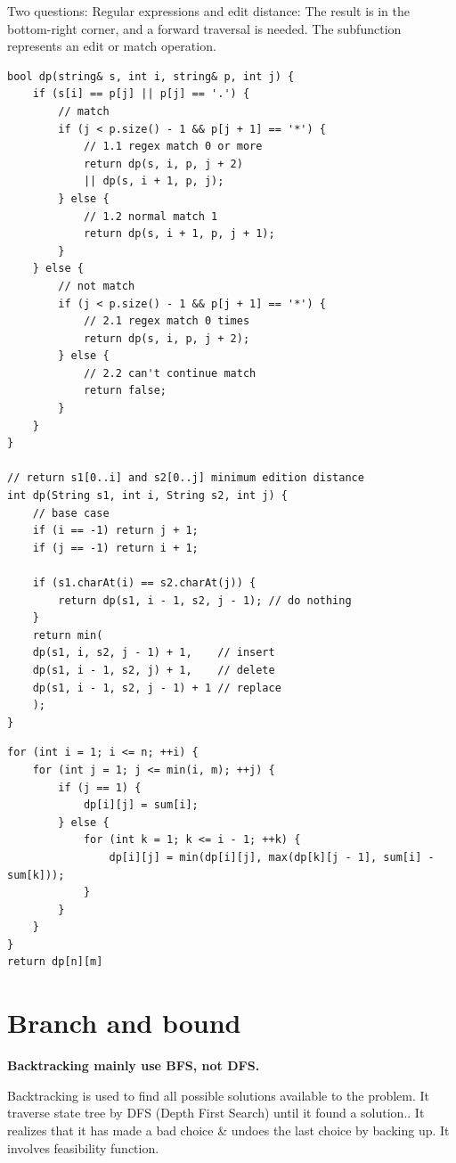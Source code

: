 \documentclass[a4paper,11pt,twoside]{book}
\begin{document}
	\par Two questions: Regular expressions and edit distance: The result is in the bottom-right corner, and a forward traversal is needed. The subfunction represents an edit or match operation.
\begin{lstlisting}
bool dp(string& s, int i, string& p, int j) {
	if (s[i] == p[j] || p[j] == '.') {
		// match
		if (j < p.size() - 1 && p[j + 1] == '*') {
			// 1.1 regex match 0 or more
			return dp(s, i, p, j + 2)
			|| dp(s, i + 1, p, j);
		} else {
			// 1.2 normal match 1 
			return dp(s, i + 1, p, j + 1);
		}
	} else {
		// not match 
		if (j < p.size() - 1 && p[j + 1] == '*') {
			// 2.1 regex match 0 times
			return dp(s, i, p, j + 2);
		} else {
			// 2.2 can't continue match
			return false;
		}
	}
}

// return s1[0..i] and s2[0..j] minimum edition distance
int dp(String s1, int i, String s2, int j) {
	// base case
	if (i == -1) return j + 1;
	if (j == -1) return i + 1;
	
	if (s1.charAt(i) == s2.charAt(j)) {
		return dp(s1, i - 1, s2, j - 1); // do nothing
	}
	return min(
	dp(s1, i, s2, j - 1) + 1,    // insert
	dp(s1, i - 1, s2, j) + 1,    // delete
	dp(s1, i - 1, s2, j - 1) + 1 // replace
	);
}		
\end{lstlisting}	
	

\begin{lstlisting}	
for (int i = 1; i <= n; ++i) {
	for (int j = 1; j <= min(i, m); ++j) {
		if (j == 1) {
			dp[i][j] = sum[i];
		} else {
			for (int k = 1; k <= i - 1; ++k) {
				dp[i][j] = min(dp[i][j], max(dp[k][j - 1], sum[i] - sum[k]));
			}
		}
	}
}
return dp[n][m]	
\end{lstlisting}	
	

	


\section{Branch and bound}

	\par \textbf{Backtracking mainly use BFS, not DFS.} 
	
	\par Backtracking is used to find all possible solutions available to the problem. It traverse state tree by DFS (Depth First Search) until it found a solution.. It realizes that it has made a bad choice \& undoes the last choice by backing up. It involves feasibility function.
\end{document}
